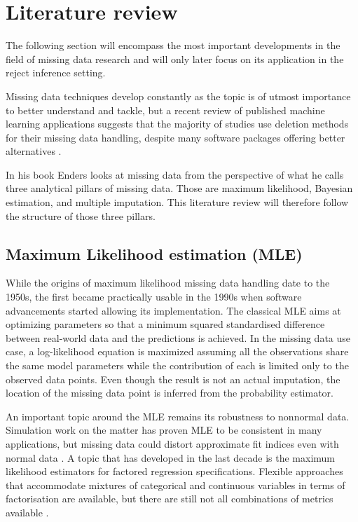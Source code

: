 \documentclass[11pt,a4paper]{article}
\begin{document}
\section{Literature review}

The following section will encompass the most important developments in the field of missing data research and will only later focus on its application in the reject inference setting. 


Missing data techniques develop constantly as the topic is of utmost importance to better understand and tackle, but a recent review of published machine learning applications suggests that the majority of studies use deletion methods for their missing data handling, despite many software packages offering better alternatives \cite{Nijman_Leeuwenberg_Beekers_Verkouter_Jacobs_Bots_Asselbergs_Moons_Debray_2022}. 

In his book \cite{enders2022applied} Enders looks at missing data from the perspective of what he calls three analytical pillars of missing data. Those are maximum likelihood, Bayesian estimation, and multiple imputation. This literature review will therefore follow the structure of those three pillars.  

\subsection{Maximum Likelihood estimation (MLE)}

While the origins of maximum likelihood missing data handling date to the 1950s, the first became practically usable in the 1990s when software advancements started allowing its implementation. The classical MLE aims at optimizing parameters so that a minimum squared standardised difference between real-world data and the predictions is achieved. In the missing data use case, a log-likelihood equation is maximized assuming all the observations share the same model parameters while the contribution of each is limited only to the observed data points\cite{enders_missing_2023}. Even though the result is not an actual imputation, the location of the missing data point is inferred from the probability estimator. 

An important topic around the MLE remains its robustness to nonnormal data. Simulation work on the matter has proven MLE to be consistent in many applications, but missing data could distort approximate fit indices even with normal data \cite{Zhang_Savalei_2023}. A topic that has developed in the last decade is the maximum likelihood estimators for factored regression specifications\cite{enders_missing_2023}. Flexible approaches that accommodate mixtures of categorical and continuous variables in terms of factorisation are available, but there are still not all combinations of metrics available \cite{Rabe-Hesketh_Skrondal_Pickles_2004, ludtke2020analysis}. 
\end{document}
